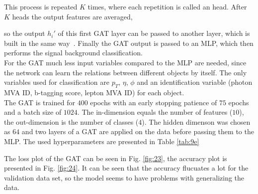 
This process is repeated $K$ times, where each repetition is called an head. After $K$ heads the output features are averaged,


so the output $h_i'$ of this first GAT layer can be passed to another layer, which is built in the same way~\cite{GAT:2018}. Finally the GAT output is passed to an MLP, which then performs the signal background classification. \\

For the GAT much less input variables compared to the MLP are needed, since the network can learn the relations between different objects by itself. The only variables used for classification are
$p_T$, $\eta$, $\phi$ and an identification variable (photon MVA ID, b-tagging score, lepton MVA ID) for each object. \\

The GAT is trained for $400$ epochs with an early stopping patience of $75$ epochs and a batch size of $1024$. The in-dimension equals the number of features ($10$), the out-dimension is the number of classes ($4$).
The hidden dimenson was chosen as $64$ and two layers of a GAT are applied on the data before passing them to the MLP. The used hyperparameters are presented in Table \ref{tab:9e}


The loss plot of the GAT can be seen in Fig. \ref{fig:23}, the accuracy plot is presented in Fig. \ref{fig:24}. It can be seen that the accuracy flucuates a lot for the validation data set, so the model seems to have problems
with generalizing the data.


